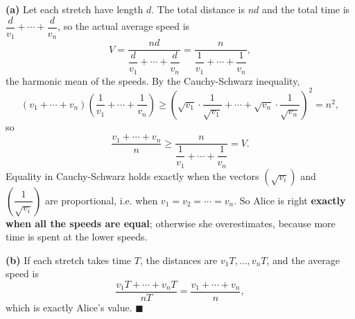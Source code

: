 \textbf{(a)} Let each stretch have length $d$. The total distance is $nd$ and the total time is $\dfrac{d}{v_1}+\cdots+\dfrac{d}{v_n}$, so the actual average speed is
\[V=\dfrac{nd}{\dfrac{d}{v_1}+\cdots+\dfrac{d}{v_n}}=\dfrac{n}{\dfrac1{v_1}+\cdots+\dfrac1{v_n}},\]
the harmonic mean of the speeds. By the Cauchy-Schwarz inequality,
\[\left(v_1+\cdots+v_n\right)\left(\dfrac1{v_1}+\cdots+\dfrac1{v_n}\right)\ge\left(\sqrt{v_1}\cdot\dfrac{1}{\sqrt{v_1}}+\cdots+\sqrt{v_n}\cdot\dfrac{1}{\sqrt{v_n}}\right)^2=n^2,\]
so
\[\dfrac{v_1+\cdots+v_n}{n}\ge\dfrac{n}{\dfrac1{v_1}+\cdots+\dfrac1{v_n}}=V.\]
Equality in Cauchy-Schwarz holds exactly when the vectors $\left(\sqrt{v_i}\right)$ and $\left(\dfrac{1}{\sqrt{v_i}}\right)$ are proportional, i.e. when $v_1=v_2=\cdots=v_n$. So Alice is right \textbf{exactly when all the speeds are equal}; otherwise she overestimates, because more time is spent at the lower speeds.

\textbf{(b)} If each stretch takes time $T$, the distances are $v_1T,\dots,v_nT$, and the average speed is
\[\dfrac{v_1T+\cdots+v_nT}{nT}=\dfrac{v_1+\cdots+v_n}{n},\]
which is exactly Alice's value. $\blacksquare$
